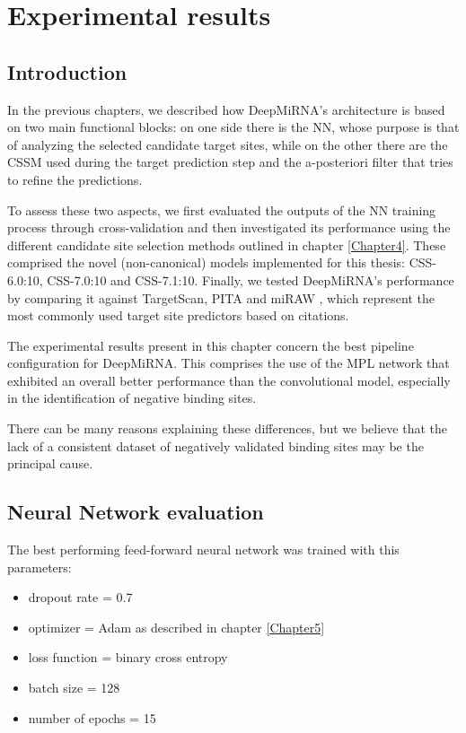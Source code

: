 
\chapter{Experimental results} %

\label{Chapter6} %

\section{Introduction}
In the previous chapters, we described how DeepMiRNA's architecture is based on two main functional blocks: on one side there is the NN, whose purpose is that of analyzing the selected candidate target sites, while on the other there are the CSSM used during the target prediction step and the a-posteriori filter that tries to refine the predictions. 

To assess these two aspects, we first evaluated the outputs of the NN training process through cross-validation and then investigated its performance using the different candidate site selection methods outlined in chapter \ref{Chapter4}. These comprised the novel (non-canonical) models implemented for this thesis: CSS-6.0:10, CSS-7.0:10 and CSS-7.1:10. Finally, we tested DeepMiRNA’s performance by comparing it against TargetScan\cite{targetscan}, PITA\cite{accessibility_nrg_role} and miRAW \cite{miraw}, which represent the most commonly used target site predictors based on citations.

The experimental results present in this chapter concern the best pipeline configuration for DeepMiRNA. This comprises the use of the MPL network that exhibited an overall better performance than the convolutional model, especially in the identification of negative binding sites. 

There can be many reasons explaining these differences, but we believe that the lack of a consistent dataset of negatively validated binding sites may be the principal cause. 

\section{Neural Network evaluation}
The best performing feed-forward neural network was trained with this parameters:

\begin{itemize}
	\item dropout rate = 0.7
	\item optimizer = Adam as described in chapter \ref{Chapter5}
	\item loss function = binary cross entropy
	\item batch size = 128
	\item number of epochs = 15
\end{itemize}

